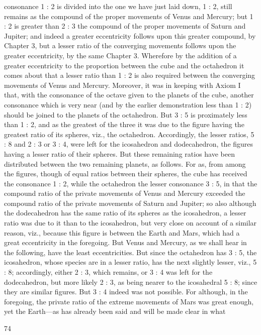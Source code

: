 \documentclass{article}
\begin{document}
consonance 1 : 2 is divided into the one we have just laid down, 1 : 2, still
remains as the compound of the proper movements of Venus and
Mercury; but 1 : 2 is greater than 2 : 3 the compound of the proper
movements of Saturn and Jupiter; and indeed a greater eccentricity
follows upon this greater compound, by Chapter 3, but a lesser ratio of
the converging movements follows upon the greater eccentricity, by the
same Chapter 3. Wherefore by the addition of a greater eccentricity to
the proportion between the cube and the octahedron it comes about that
a lesser ratio than 1 : 2 is also required between the converging
movements of Venus and Mercury. Moreover, it was in keeping with
Axiom I that, with the consonance of the octave given to the planets of
the cube, another consonance which is very near (and by the earlier
demonstration less than 1 : 2) should be joined to the planets of the
octahedron. But 3 : 5 is proximately less than 1 : 2, and as the greatest of
the three it was due to the figure having the greatest ratio of its
spheres, viz., the octahedron. Accordingly, the lesser ratios, 5 : 8 and 2 :
3 or 3 : 4, were left for the icosahedron and dodecahedron, the figures
having a lesser ratio of their spheres.
But these remaining ratios have been distributed between the two
remaining planets, as follows. For as, from among the figures, though of
equal ratios between their spheres, the cube has received the consonance
1 : 2, while the octahedron the lesser consonance 3 : 5, in that the
compound ratio of the private movements of Venus and Mercury
exceeded the compound ratio of the private movements of Saturn and
Jupiter; so also although the dodecahedron has the same ratio of its
spheres as the icosahedron, a lesser ratio was due to it than to the
icosahedron, but very close on account of a similar reason, viz., because
this figure is between the Earth and Mars, which had a great eccentricity
in the foregoing. But Venus and Mercury, as we shall hear in the
following, have the least eccentricities. But since the octahedron has 3 :
5, the icosahedron, whose species are in a lesser ratio, has the next
slightly lesser, viz., 5 : 8; accordingly, either 2 : 3, which remains, or 3 : 4
was left for the dodecahedron, but more likely 2 : 3, as being nearer to
the icosahedral 5 : 8; since they are similar figures.
But 3 : 4 indeed was not possible. For although, in the foregoing, the
private ratio of the extreme movements of Mars was great enough, yet
the Earth—as has already been said and will be made clear in what


74
\end{document}
